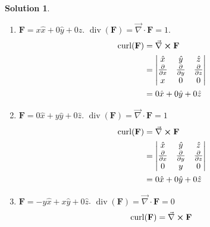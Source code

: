 \documentclass[10pt]{article}
\theoremstyle{definition}
\newtheorem{soln}{Solution}
\newcommand{\ux}{\hat{x}}
\newcommand{\uy}{\hat{y}}
\newcommand{\uz}{\hat{z}}
\DeclareMathOperator{\Div}{div}
\DeclareMathOperator{\Curl}{curl}
\begin{document}
\begin{soln}
  \begin{enumerate}[label=(\alph*)]
    \item $\mathbf{F}=x\ux+0\uy+0\uz$.
          $\Div(\mathbf{F})=\vec{\nabla} \cdot \mathbf{F}=1$.
          \begin{align*}
            \Curl(\mathbf{F}) & =\vec{\nabla} \cross \mathbf{F}                                                          \\
                              & =\begin{vmatrix}
                                   \ux                         & \uy                         & \uz                         \\
                                   \frac{\partial}{\partial x} & \frac{\partial}{\partial y} & \frac{\partial}{\partial z} \\
                                   x                           & 0                           & 0
                                 \end{vmatrix} \\
                              & = 0\ux + 0\uy+0\uz
          \end{align*}
    \item $\mathbf{F}=0\ux+y\uy+0\uz$. $\Div(\mathbf{F})=\vec{\nabla} \cdot \mathbf{F}=1$
          \begin{align*}
            \Curl(\mathbf{F}) & =\vec{\nabla} \cross \mathbf{F}                                                          \\
                              & =\begin{vmatrix}
                                   \ux                         & \uy                         & \uz                         \\
                                   \frac{\partial}{\partial x} & \frac{\partial}{\partial y} & \frac{\partial}{\partial z} \\
                                   0                           & y                           & 0
                                 \end{vmatrix} \\
                              & = 0\ux + 0\uy+ 0\uz
          \end{align*}
    \item $\mathbf{F}=-y\ux+x\uy+0\uz$. $\Div(\mathbf{F})=\vec{\nabla} \cdot \mathbf{F}=0$
          \begin{align*}
            \Curl(\mathbf{F}) & =\vec{\nabla} \cross \mathbf{F}                                                           \\

\end{align*}
\end{enumerate}
\end{soln}
\end{document}
